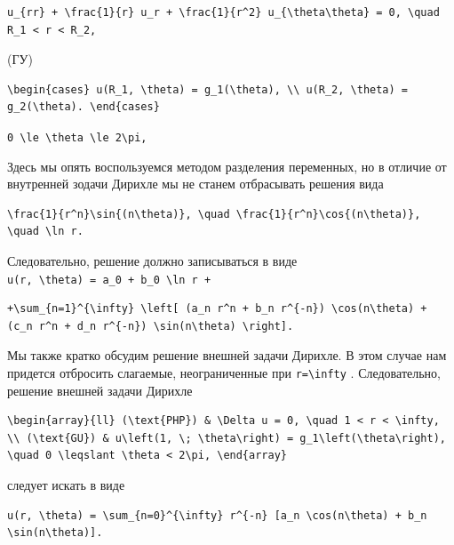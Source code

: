 \documentclass[
  ukrainian,
]{article}
\begin{document}
\begin{verbatim}
u_{rr} + \frac{1}{r} u_r + \frac{1}{r^2} u_{\theta\theta} = 0, \quad R_1 < r < R_2,
\end{verbatim}

(ГУ)

\begin{verbatim}
\begin{cases} u(R_1, \theta) = g_1(\theta), \\ u(R_2, \theta) = g_2(\theta). \end{cases}
\end{verbatim}

\texttt{0\ \textbackslash{}le\ \textbackslash{}theta\ \textbackslash{}le\ 2\textbackslash{}pi,}

Здесь мы опять воспользуемся методом разделения переменных, но в отличие
от внутренней зодачи Дирихле мы не станем отбрасывать решения вида

\begin{verbatim}
\frac{1}{r^n}\sin{(n\theta)}, \quad \frac{1}{r^n}\cos{(n\theta)}, \quad \ln r.
\end{verbatim}

Следовательно, решение должно записываться в виде
\texttt{u(r,\ \textbackslash{}theta)\ =\ a\_0\ +\ b\_0\ \textbackslash{}ln\ r\ +}

\begin{verbatim}
+\sum_{n=1}^{\infty} \left[ (a_n r^n + b_n r^{-n}) \cos(n\theta) + (c_n r^n + d_n r^{-n}) \sin(n\theta) \right].
\end{verbatim}

Мы также кратко обсудим решение внешней задачи Дирихле. В этом случае
нам придется отбросить слагаемые, неограниченные при
\texttt{r=\textbackslash{}infty} . Следовательно, решение внешней задачи
Дирихле

\begin{verbatim}
\begin{array}{ll} (\text{PHP}) & \Delta u = 0, \quad 1 < r < \infty, \\ (\text{GU}) & u\left(1, \; \theta\right) = g_1\left(\theta\right), \quad 0 \leqslant \theta < 2\pi, \end{array}
\end{verbatim}

следует искать в виде

\begin{verbatim}
u(r, \theta) = \sum_{n=0}^{\infty} r^{-n} [a_n \cos(n\theta) + b_n \sin(n\theta)].
\end{verbatim}
\end{document}
